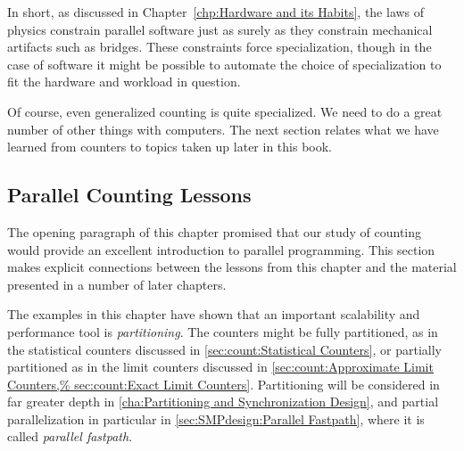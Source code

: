 In short, as discussed in
Chapter~\ref{chp:Hardware and its Habits},
the laws of physics constrain parallel software just as surely as they
constrain mechanical artifacts such as bridges.
These constraints force specialization, though in the case of software
it might be possible to automate the choice of specialization to
fit the hardware and workload in question.

Of course, even generalized counting is quite specialized.
We need to do a great number of other things with computers.
The next section relates what we have learned from counters to
topics taken up later in this book.

\subsection{Parallel Counting Lessons}
\label{sec:count:Parallel Counting Lessons}

The opening paragraph of this chapter promised that our study of counting
would provide an excellent introduction to parallel programming.
This section makes explicit connections between the lessons from
this chapter and the material presented in a number of later chapters.

The examples in this chapter have shown that an important scalability
and performance tool is \emph{partitioning}.
The counters might be fully partitioned, as in the statistical counters
discussed in \cref{sec:count:Statistical Counters},
or partially partitioned as in the limit counters discussed in
\cref{sec:count:Approximate Limit Counters,%
sec:count:Exact Limit Counters}.
Partitioning will be considered in far greater depth in
\cref{cha:Partitioning and Synchronization Design},
and partial parallelization in particular in
\cref{sec:SMPdesign:Parallel Fastpath}, where it is called
\emph{parallel fastpath}.

